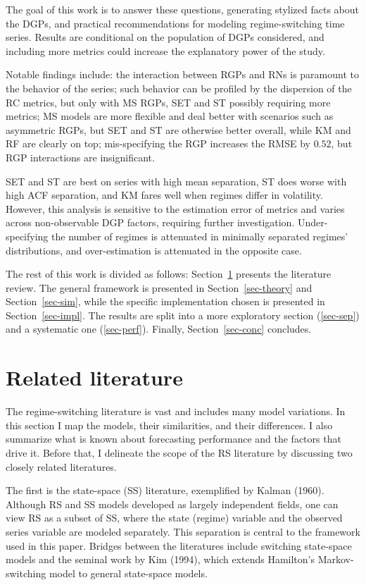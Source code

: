 \documentclass[
  letterpaper,
  DIV=11,
  numbers=noendperiod]{scrartcl}
\numberwithin{equation}{section}
\numberwithin{table}{section}
\numberwithin{figure}{section}
\let\oldsection\section
\renewcommand\section{\clearpage\oldsection}
\begin{document}
The goal of this work is to answer these questions, generating stylized
facts about the DGPs, and practical recommendations for modeling
regime-switching time series. Results are conditional on the population
of DGPs considered, and including more metrics could increase the
explanatory power of the study.

Notable findings include: the interaction between RGPs and RNs is
paramount to the behavior of the series; such behavior can be profiled
by the dispersion of the RC metrics, but only with MS RGPs, SET and ST
possibly requiring more metrics; MS models are more flexible and deal
better with scenarios such as asymmetric RGPs, but SET and ST are
otherwise better overall, while KM and RF are clearly on top;
mis-specifying the RGP increases the RMSE by \(0.52\), but RGP
interactions are insignificant.

SET and ST are best on series with high mean separation, ST does worse
with high ACF separation, and KM fares well when regimes differ in
volatility. However, this analysis is sensitive to the estimation error
of metrics and varies across non-observable DGP factors, requiring
further investigation. Under-specifying the number of regimes is
attenuated in minimally separated regimes' distributions, and
over-estimation is attenuated in the opposite case.

The rest of this work is divided as follows: Section~\ref{sec-lit}
presents the literature review. The general framework is presented in
Section~\ref{sec-theory} and Section~\ref{sec-sim}, while the specific
implementation chosen is presented in Section~\ref{sec-impl}. The
results are split into a more exploratory section (\ref{sec-sep}) and a
systematic one (\ref{sec-perf}). Finally, Section~\ref{sec-conc}
concludes.

\section{Related literature}\label{sec-lit}

The regime-switching literature is vast and includes many model
variations. In this section I map the models, their similarities, and
their differences. I also summarize what is known about forecasting
performance and the factors that drive it. Before that, I delineate the
scope of the RS literature by discussing two closely related
literatures.

The first is the state-space (SS) literature, exemplified by Kalman
(1960). Although RS and SS models developed as largely independent
fields, one can view RS as a subset of SS, where the state (regime)
variable and the observed series variable are modeled separately. This
separation is central to the framework used in this paper. Bridges
between the literatures include switching state-space models and the
seminal work by Kim (1994), which extends Hamilton's Markov-switching
model to general state-space models.
\end{document}

